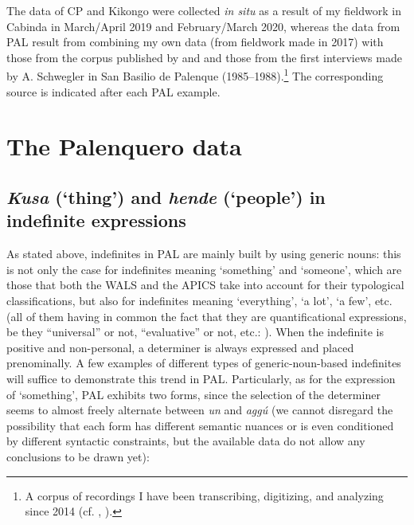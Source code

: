 \documentclass[output=paper,colorlinks,citecolor=brown]{langscibook}
\begin{document}
The data of CP and Kikongo were collected \textit{in situ} as a result of my fieldwork in Cabinda in March/April 2019 and February/March 2020, whereas the data from PAL result from combining my own data (from fieldwork made in 2017) with those from the corpus published by \citet{FriedemannRosselli1983} and \citet{MagliaMoñino2015} and those from the first interviews made by A. Schwegler in San Basilio de Palenque (1985--1988).\footnote{A corpus of recordings I have been transcribing, digitizing, and analyzing since 2014 (cf. \cite{GutiérrezMaté2017}, \citeyear{GutiérrezMaté2020}).} The corresponding source is indicated after each PAL example.

\section{The Palenquero data}\label{sec:gut2}
\subsection{\textit{Kusa} (‘thing’) and \textit{hende} (‘people’) in indefinite expressions}\label{sec:gut2.1}

As stated above, indefinites in PAL are mainly built by using generic nouns: this is not only the case for indefinites meaning ‘something’ and ‘someone’, which are those that both the WALS and the APICS take into account for their typological classifications, but also for indefinites meaning ‘everything’, ‘a lot’, ‘a few’, etc. (all of them having in common the fact that they are quantificational expressions, be they “universal” or not, “evaluative” or not, etc.: \cite[501--502]{BosqueGutiérrez-Rexach2009}). When the indefinite is positive and non-personal, a determiner is always expressed and placed prenominally. A few examples of different types of generic-noun-based indefinites will suffice to demonstrate this trend in PAL. Particularly, as for the expression of ‘something’, PAL exhibits two forms, since the selection of the determiner seems to almost freely alternate between \textit{un} and \textit{aggú} (we cannot disregard the possibility that each form has different semantic nuances or is even conditioned by different syntactic constraints, but the available data do not allow any conclusions to be drawn yet):
\end{document}
